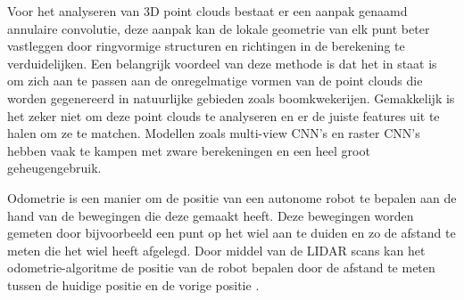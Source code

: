 Voor het analyseren van 3D point clouds bestaat er een aanpak genaamd annulaire convolutie, deze aanpak kan de lokale geometrie van elk punt beter vastleggen door ringvormige structuren en richtingen in de berekening te verduidelijken.
Een belangrijk voordeel van deze methode is dat het in staat is om zich aan te passen aan de onregelmatige vormen van de point clouds die worden gegenereerd in natuurlijke gebieden zoals boomkwekerijen.
Gemakkelijk is het zeker niet om deze point clouds te analyseren en er de juiste features uit te halen om ze te matchen.
Modellen zoals multi-view CNN's en raster CNN's hebben vaak te kampen met zware berekeningen en een heel groot geheugengebruik.\autocite{Komarichev_2019_CVPR}

Odometrie is een manier om de positie van een autonome robot te bepalen aan de hand van de bewegingen die deze gemaakt heeft.
Deze bewegingen worden gemeten door bijvoorbeeld een punt op het wiel aan te duiden en zo de afstand te meten die het wiel heeft afgelegd.
Door middel van de LIDAR scans kan het odometrie-algoritme de positie van de robot bepalen door de afstand te meten tussen de huidige positie en de vorige positie \autocite{zhang2014loam}.



